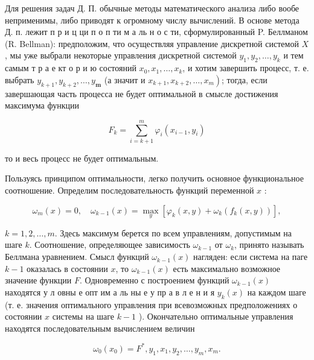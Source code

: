 \documentclass[10pt]{article}
\begin{document}
Для решения задач Д. П. обычные методы математического анализа либо вообе неприменимы, либо приводят к огромному числу вычислений. В основе метода Д. п. лежит п р и ц ци п о п ти м а ль н о с ти, сформулированный P. Беллманом (R. Bellman): предположим, что осуществляя управление дискретной системой $X$, мы уже выбрали некоторые управления дискретной системой $y_{1}, y_{2}, \ldots, y_{k}$ и тем самым т р а е кт о р и ю состояний $x_{0}, x_{1}, \ldots, x_{k}$, и хотим завершить процесс, т. е. выбрать $y_{k+1}, y_{k+2}, \ldots, y_{\boldsymbol{m}}$ (а значит и $\left.x_{k+1}, x_{k+2}, \ldots, x_{m}\right)$; тогда, если завершающая часть процесса не будет оптимальной в смысле достижения максимума функции



\[

F_{k}=\sum_{i=k+1}^{m} \varphi_{i}\left(x_{i-1}, y_{i}\right)

\]



то и весь процесс не будет оптимальным.



Пользуясь принципом оптимальности, легко получить основное функциональное соотношение. Определим последовательность функций переменной $x$ :



\[

\omega_{m}(x)=0, \quad \omega_{k-1}(x)=\max _{y}\left[\varphi_{k}(x, y)+\omega_{k}\left(f_{k}(x, y)\right)\right],

\]



$k=1,2, \ldots, m$. Здесь максимум берется по всем управлениям, допустимым на шаге $k$. Соотношение, определяющее зависимость $\omega_{k-1}$ от $\omega_{k}$, принято называть Беллмана уравнением. Смысл функций $\omega_{k-1}(x)$ нагляден: если система на паге $k-1$ оказалась в состоянии $x$, то $\omega_{k-1}(x)$ есть максимально возможное значение функции $F$. Одновременно с построением функций $\omega_{k-1}(x)$ находятся у л овны е опт им а ль ны е у пр а в л е н и я $y_{k}(x)$ на каждом шаге (т. е. значения оптимального управления при всевозможных предположениях о состоянии $x$ системы на шаге $k-1$ ). Окончательно оптимальные управления находятся последовательным вычислением величин



\[

\omega_{0}\left(x_{0}\right)=F^{*}, y_{1}, x_{1}, y_{2}, \ldots, y_{m}, x_{m} .

\]
\end{document}
